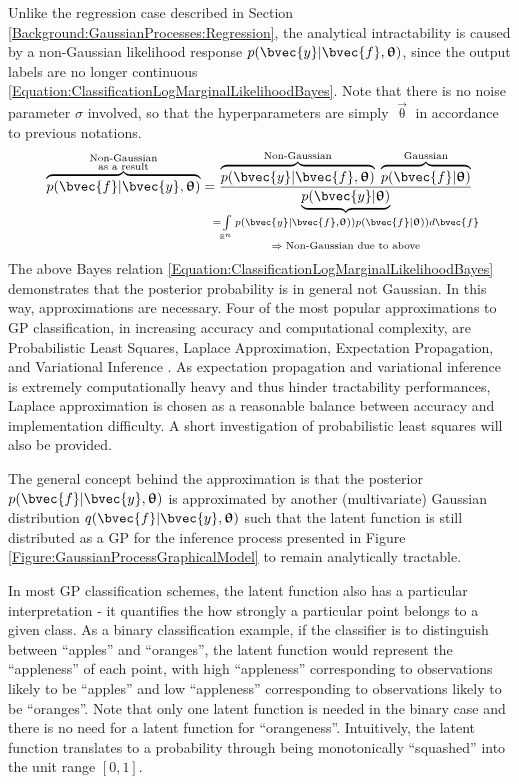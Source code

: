 		Unlike the regression case described in Section \ref{Background:GaussianProcesses:Regression}, the analytical intractability is caused by a non-Gaussian likelihood response $p(\bvec{y} | \bvec{f}, \vec{\uptheta})$, since the output labels are no longer continuous \eqref{Equation:ClassificationLogMarginalLikelihoodBayes}. Note that there is no noise parameter $\sigma$ involved, so that the hyperparameters are simply $\vec{\uptheta}$ in accordance to previous notations. \begin{equation}
			\overbrace{p(\bvec{f} | \bvec{y}, \vec{\uptheta})}^{\mathclap{\substack{\text{Non-Gaussian} \\ \text{as a result}}}} = \frac{\overbrace{p(\bvec{y} | \bvec{f}, \vec{\uptheta})}^{\text{Non-Gaussian}} \; \overbrace{p(\bvec{f} | \vec{\uptheta})}^{\text{Gaussian}}}{\underbrace{p(\bvec{y} | \vec{\uptheta})}_{\mathclap{\substack{= \int\limits_{\mathbb{R}^{n}} p(\bvec{y} | \bvec{f}, \vec{\uptheta})) p(\bvec{f} | \vec{\uptheta})) d\bvec{f} \\ \Rightarrow \; \text{Non-Gaussian due to above}}}}}
		\label{Equation:ClassificationLogMarginalLikelihoodBayes}
		\end{equation} The above Bayes relation \eqref{Equation:ClassificationLogMarginalLikelihoodBayes} demonstrates that the posterior probability is in general not Gaussian. In this way, approximations are necessary. Four of the most popular approximations to GP classification, in increasing accuracy and computational complexity, are Probabilistic Least Squares, Laplace Approximation, Expectation Propagation, and Variational Inference \citep{GaussianProcessForMachineLearning}. As expectation propagation and variational inference is extremely computationally heavy and thus hinder tractability performances, Laplace approximation is chosen as a reasonable balance between accuracy and implementation difficulty. A short investigation of probabilistic least squares will also be provided.
		
		The general concept behind the approximation is that the posterior $p(\bvec{f} | \bvec{y}, \vec{\uptheta})$ is approximated by another (multivariate) Gaussian distribution $q(\bvec{f} | \bvec{y}, \vec{\uptheta})$ such that the latent function is still distributed as a GP for the inference process presented in Figure \ref{Figure:GaussianProcessGraphicalModel} to remain analytically tractable.
		
		In most GP classification schemes, the latent function also has a particular interpretation - it quantifies the how strongly a particular point belongs to a given class. As a binary classification example, if the classifier is to distinguish between ``apples'' and ``oranges'', the latent function would represent the ``appleness'' of each point, with high ``appleness'' corresponding to observations likely to be ``apples'' and low ``appleness'' corresponding to observations likely to be ``oranges''. Note that only one latent function is needed in the binary case and there is no need for a latent function for ``orangeness''. Intuitively, the latent function translates to a probability through being monotonically ``squashed'' into the unit range $[0, 1]$.
		
